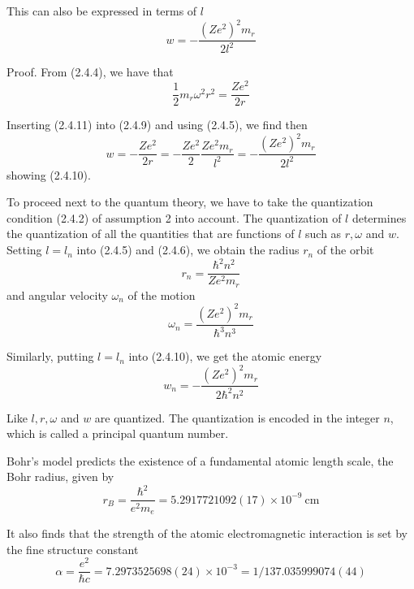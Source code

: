 \documentclass{article}
\begin{document}
This can also be expressed in terms of $l$
$$
\begin{equation*}
w=-\frac{\left(Z e^{2}\right)^{2} m_{r}}{2 l^{2}} \tag{2.4.10}
\end{equation*}
$$

Proof. From (2.4.4), we have that
$$
\begin{equation*}
\frac{1}{2} m_{r} \omega^{2} r^{2}=\frac{Z e^{2}}{2 r} \tag{2.4.11}
\end{equation*}
$$

Inserting (2.4.11) into (2.4.9) and using (2.4.5), we find then
$$
\begin{equation*}
w=-\frac{Z e^{2}}{2 r}=-\frac{Z e^{2}}{2} \frac{Z e^{2} m_{r}}{l^{2}}=-\frac{\left(Z e^{2}\right)^{2} m_{r}}{2 l^{2}} \tag{2.4.12}
\end{equation*}
$$
showing (2.4.10).

To proceed next to the quantum theory, we have to take the quantization condition (2.4.2) of assumption 2 into account. The quantization of $l$ determines the quantization of all the quantities that are functions of $l$ such as $r, \omega$ and $w$. Setting $l=l_{n}$ into (2.4.5) and (2.4.6), we obtain the radius $r_{n}$ of the orbit
$$
\begin{equation*}
r_{n}=\frac{\hbar^{2} n^{2}}{Z e^{2} m_{r}} \tag{2.4.13}
\end{equation*}
$$
and angular velocity $\omega_{n}$ of the motion
$$
\begin{equation*}
\omega_{n}=\frac{\left(Z e^{2}\right)^{2} m_{r}}{\hbar^{3} n^{3}} \tag{2.4.14}
\end{equation*}
$$

Similarly, putting $l=l_{n}$ into (2.4.10), we get the atomic energy
$$
\begin{equation*}
w_{n}=-\frac{\left(Z e^{2}\right)^{2} m_{r}}{2 \hbar^{2} n^{2}} \tag{2.4.15}
\end{equation*}
$$

Like $l, r, \omega$ and $w$ are quantized. The quantization is encoded in the integer $n$, which is called a principal quantum number.

Bohr's model predicts the existence of a fundamental atomic length scale, the Bohr radius, given by
$$
\begin{equation*}
r_{B}=\frac{\hbar^{2}}{e^{2} m_{e}}=5.2917721092(17) \times 10^{-9} \mathrm{~cm} \tag{2.4.16}
\end{equation*}
$$

It also finds that the strength of the atomic electromagnetic interaction is set by the fine structure constant
$$
\begin{equation*}
\alpha=\frac{e^{2}}{\hbar c}=7.2973525698(24) \times 10^{-3}=1 / 137.035999074(44) \tag{2.4.17}
\end{equation*}
$$
\end{document}
